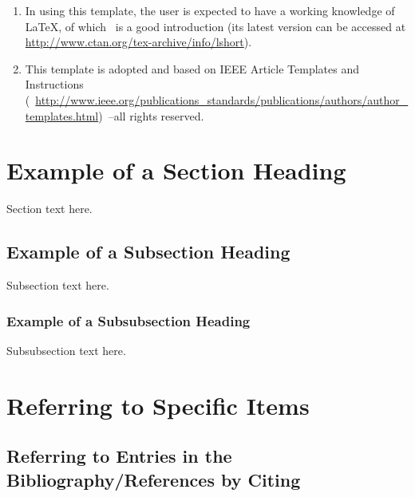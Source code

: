 \begin{enumerate}
	\item In using this template, the user is expected to have a working knowledge of \LaTeX, of which~\cite{Oetiker2014} is a good introduction (its latest version can be accessed at \url{http://www.ctan.org/tex-archive/info/lshort}). 
	
	\item This template is adopted and based on IEEE Article Templates and Instructions (~\url{http://www.ieee.org/publications_standards/publications/authors/author_templates.html})~\cite{Shell2015, IEEEMSW2013}--all rights reserved.
\end{enumerate}
		








 

















\section{Example of a Section Heading}
Section text here. 

\subsection{Example of a Subsection Heading}
Subsection text here. 

\subsubsection{Example of a Subsubsection Heading}
Subsubsection text here. 





\section{Referring to Specific Items}

\subsection{Referring to Entries in the Bibliography/References by Citing}

